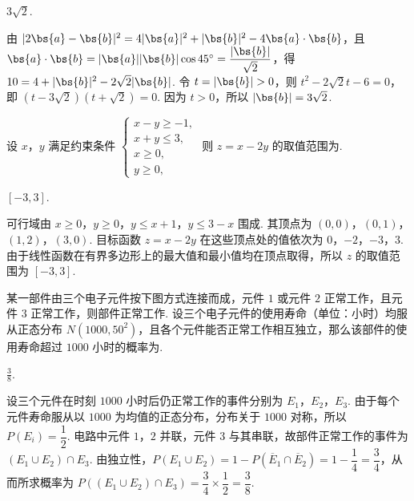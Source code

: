 \begin{answer}
\(3\sqrt{2}\).
\end{answer}

\begin{solution}
由 \(|2\bs{a}-\bs{b}|^2=4|\bs{a}|^2+|\bs{b}|^2-4\bs{a}\cdot\bs{b}\)，且 \(\bs{a}\cdot\bs{b}=|\bs{a}||\bs{b}|\cos45^\circ=\dfrac{|\bs{b}|}{\sqrt2}\)，得 \(10=4+|\bs{b}|^2-2\sqrt2|\bs{b}|\). 令 \(t=|\bs{b}|>0\)，则 \(t^2-2\sqrt2t-6=0\)，即 \((t-3\sqrt2)(t+\sqrt2)=0\). 因为 \(t>0\)，所以 \(|\bs{b}|=3\sqrt2\).
\end{solution}

\begin{problem}
设 \(x\)，\(y\) 满足约束条件 \(\begin{cases}
x - y \geqslant -1,\\
x + y \leqslant 3,\\
x \geqslant 0,\\
y \geqslant 0,
\end{cases}\) 则 \(z = x - 2y\) 的取值范围为\fillinblank{}.
\end{problem}

\begin{answer}
\(\left[-3,3\right]\).
\end{answer}

\begin{solution}
可行域由 \(x\geqslant0\)，\(y\geqslant0\)，\(y\leqslant x+1\)，\(y\leqslant3-x\) 围成. 其顶点为 \((0,0)\)，\((0,1)\)，\((1,2)\)，\((3,0)\). 目标函数 \(z=x-2y\) 在这些顶点处的值依次为 \(0\)，\(-2\)，\(-3\)，\(3\). 由于线性函数在有界多边形上的最大值和最小值均在顶点取得，所以 \(z\) 的取值范围为 \([-3,3]\).
\end{solution}

\begin{problem}
某一部件由三个电子元件按下图方式连接而成，元件 \(1\) 或元件 \(2\) 正常工作，且元件 \(3\) 正常工作，则部件正常工作. 设三个电子元件的使用寿命（单位：小时）均服从正态分布 \(N(1000, 50^{2})\)，且各个元件能否正常工作相互独立，那么该部件的使用寿命超过 \(1000\) 小时的概率为\fillinblank{}.

\end{problem}

\begin{answer}
\(\frac{3}{8}\).
\end{answer}

\begin{solution}
设三个元件在时刻 \(1000\) 小时后仍正常工作的事件分别为 \(E_1\)，\(E_2\)，\(E_3\). 由于每个元件寿命服从以 \(1000\) 为均值的正态分布，分布关于 \(1000\) 对称，所以 \(P(E_i)=\dfrac12\). 电路中元件 \(1\)，\(2\) 并联，元件 \(3\) 与其串联，故部件正常工作的事件为 \((E_1\cup E_2)\cap E_3\). 由独立性，\(P(E_1\cup E_2)=1-P(\overline E_1\cap\overline E_2)=1-\dfrac14=\dfrac34\)，从而所求概率为 \(P((E_1\cup E_2)\cap E_3)=\dfrac34\times\dfrac12=\dfrac38\).
\end{solution}

